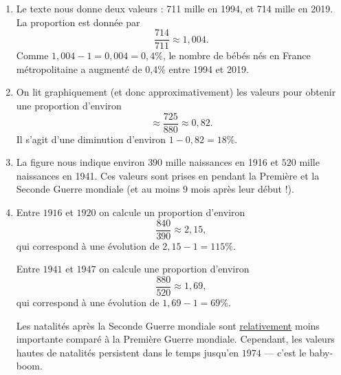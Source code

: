 {\begin{enumerate}
		\item 
		Le texte nous donne deux valeurs : 711 mille en 1994, et 714 mille en 2019.
		La proportion est donnée par 
			\[ \dfrac{714}{711} \approx 1,004. \]
		Comme $1,004 - 1 = 0,004 = 0,4\%$, le nombre de bébés nés en France métropolitaine a augmenté de 0,4\% entre 1994 et 2019.
		
		\item
		On lit graphiquement (et donc approximativement) les valeurs pour obtenir une proportion d'environ
			\[ \approx \dfrac{725}{880} \approx 0,82. \]
		Il s'agit d'une diminution d'environ $1-0,82 = 18\%$.
		
		\item 
		La figure nous indique environ $390$ mille naissances en 1916 et $520$ mille naissances en 1941.
		Ces valeurs sont prises en pendant la Première et la Seconde Guerre mondiale (et au moins $9$ mois après leur début !).
		
		\item Entre $1916$ et $1920$ on calcule un proportion d'environ
			\[ \dfrac{840}{390} \approx 2,15, \]
		qui correspond à une évolution de $2,15-1 = 115\%$.
		
		Entre $1941$ et $1947$ on calcule une proportion d'environ
			\[ \dfrac{880}{520} \approx 1,69, \]
		qui correspond à une évolution de $1,69 - 1 = 69\%$.
		
		Les natalités après la Seconde Guerre mondiale sont \underline{relativement} moins importante comparé à la Première Guerre mondiale. 
		Cependant, les valeurs hautes de natalités persistent dans le temps jusqu'en $1974$ — c'est le baby-boom.
		
	\end{enumerate}
}

\newpage



